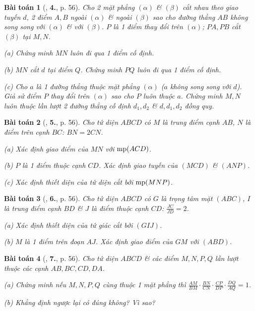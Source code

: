 \documentclass{article}
\numberwithin{equation}{section}
\newtheorem{baitoan}{Bài toán}[section]
\begin{document}
\begin{baitoan}[\cite{TL_chuyen_Toan_Hinh_Hoc_11}, \textbf{4.}, p. 56]
	Cho 2 mặt phẳng $(\alpha)$ \& $(\beta)$ cắt nhau theo giao tuyến $d$, 2 điểm $A,B$ ngoài $(\alpha)$ \& ngoài $(\beta)$ sao cho đường thẳng $AB$ không song song với $(\alpha)$ \& với $(\beta)$. $P$ là 1 điểm thay đổi trên $(\alpha)$; $PA,PB$ cắt $(\beta)$ tại $M,N$.
	\begin{enumerate*}
		\item[(a)] Chứng minh $MN$ luôn đi qua 1 điểm cố định.
		\item[(b)] $MN$ cắt $d$ tại điểm $Q$. Chứng minh $PQ$ luôn đi qua 1 điểm cố định.
		\item[(c)] Cho $a$ là 1 đường thẳng thuộc mặt phẳng $(\alpha)$ ($a$ không song song với $d$). Giả sử điểm $P$ thay đổi trên $(\alpha)$ sao cho $P$ luôn thuộc $a$. Chứng minh $M,N$ luôn thuộc lần lượt 2 đường thẳng cố định $d_1,d_2$ \& $d,d_1,d_2$ đồng quy.
	\end{enumerate*}
\end{baitoan}

\begin{baitoan}[\cite{TL_chuyen_Toan_Hinh_Hoc_11}, \textbf{5.}, p. 56]
	Cho tứ diện $ABCD$ có $M$ là trung điểm cạnh $AB$, $N$ là điểm trên cạnh $BC$: $BN = 2CN$.
	\begin{enumerate*}
		\item[(a)] Xác định giao điểm của $MN$ với ${\rm mp}(ACD)$.
		\item[(b)] $P$ là 1 điểm thuộc cạnh $CD$. Xác định giao tuyến của $(MCD)$ \& $(ANP)$.
		\item[(c)] Xác định thiết diện của tứ diện cắt bởi ${\rm mp}(MNP)$.
	\end{enumerate*}
\end{baitoan}

\begin{baitoan}[\cite{TL_chuyen_Toan_Hinh_Hoc_11}, \textbf{6.}, p. 56]
	Cho tứ diện $ABCD$ có $G$ là trọng tâm mặt $(ABC)$, $I$ là trung điểm cạnh $BD$ \& $J$ là điểm thuộc cạnh $CD$: $\frac{JC}{JD} = 2$.
	\begin{enumerate*}
		\item[(a)] Xác định thiết diện của tứ giác cắt bởi $(GIJ)$.
		\item[(b)] $M$ là 1 điểm trên đoạn $AJ$. Xác định giao điểm của $GM$ với $(ABD)$.
	\end{enumerate*}
\end{baitoan}

\begin{baitoan}[\cite{TL_chuyen_Toan_Hinh_Hoc_11}, \textbf{7.}, p. 56]
	Cho tứ diện $ABCD$ \& các điểm $M,N,P,Q$  lần lượt thuộc các cạnh $AB,BC,CD,DA$.
	\begin{enumerate*}
		\item[(a)] Chứng minh nếu $M,N,P,Q$ cùng thuộc 1 mặt phẳng thì $\frac{AM}{BM}\cdot\frac{BN}{CN}\cdot\frac{CP}{DP}\cdot\frac{DQ}{AQ} = 1$.
		\item[(b)] Khẳng định ngược lại có đúng không? Vì sao?
	\end{enumerate*}
\end{baitoan}
\end{document}
